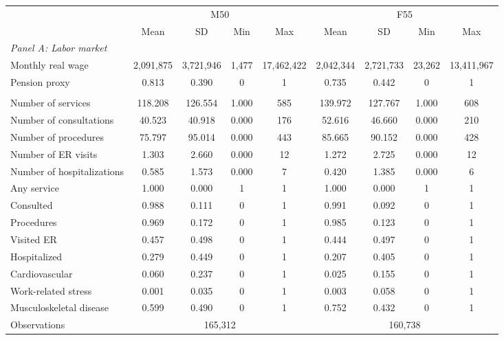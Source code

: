 \begin{tabular}{lcccccccc}
\toprule
& \multicolumn{4}{c}{M50} & \multicolumn{4}{c}{F55} \\
\cmidrule(l){2-5} \cmidrule(l){6-9}
& Mean & SD & Min & Max & Mean & SD & Min & Max \\
\midrule
\multicolumn{9}{l}{\textit{Panel A: Labor market}} \\
Monthly real wage &     2,091,875 &     3,721,946 &         1,477 &    17,462,422 &     2,042,344 &     2,721,733 &        23,262 &    13,411,967 \\ 
Pension proxy &         0.813 &         0.390 &             0 &             1 &         0.735 &         0.442 &             0 &             1 \\ \addlinespace
\multicolumn{9}{l}{\textit{Panel B: Health}} \\
Number of services &    118.208 &    126.554 &      1.000 &           585 &    139.972 &    127.767 &      1.000 &           608 \\ 
Number of consultations &     40.523 &     40.918 &      0.000 &           176 &     52.616 &     46.660 &      0.000 &           210 \\ 
Number of procedures &     75.797 &     95.014 &      0.000 &           443 &     85.665 &     90.152 &      0.000 &           428 \\ 
Number of ER visits &      1.303 &      2.660 &      0.000 &            12 &      1.272 &      2.725 &      0.000 &            12 \\ 
Number of hospitalizations &      0.585 &      1.573 &      0.000 &             7 &      0.420 &      1.385 &      0.000 &             6 \\ 
Any service &      1.000 &      0.000 &          1 &          1 &      1.000 &      0.000 &          1 &          1 \\ 
Consulted &      0.988 &      0.111 &          0 &          1 &      0.991 &      0.092 &          0 &          1 \\ 
Procedures &      0.969 &      0.172 &          0 &          1 &      0.985 &      0.123 &          0 &          1 \\ 
Visited ER &      0.457 &      0.498 &          0 &          1 &      0.444 &      0.497 &          0 &          1 \\ 
Hospitalized &      0.279 &      0.449 &          0 &          1 &      0.207 &      0.405 &          0 &          1 \\ 
Cardiovascular &      0.060 &      0.237 &          0 &          1 &      0.025 &      0.155 &          0 &          1 \\ 
Work-related stress &      0.001 &      0.035 &          0 &          1 &      0.003 &      0.058 &          0 &          1 \\ 
Musculoskeletal disease &      0.599 &      0.490 &          0 &          1 &      0.752 &      0.432 &          0 &          1 \\ 
\midrule
Observations & \multicolumn{4}{c}{165,312} & \multicolumn{4}{c}{160,738} \\
\bottomrule
\end{tabular}
